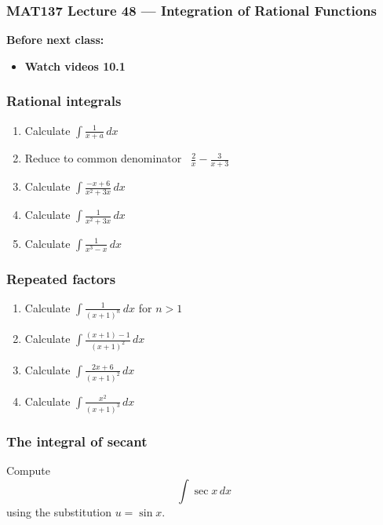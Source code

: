\documentclass[14pt]{beamer}
\newcommand{\setsize}[1]{\fontsize{#1}{#1}\selectfont} %
\newcommand{\smallerfont}{\setsize{13}} %
\newcommand{\vv}{\vspace{.2cm}}
\begin{document}
\begin{frame}
	\frametitle{MAT137 Lecture 48 --- Integration of Rational Functions}

	\vfill
	{\bf Before next class:}
		\begin{itemize} \normalsize
			\item {\bf Watch videos 10.1}
		\end{itemize}
\end{frame}
	\begin{frame}[t]
		\smallerfont
		\frametitle{Rational integrals}

		\begin{enumerate}
			\item Calculate ${\displaystyle \int \frac{1}{x+a} \, dx}$ \vv

			\item Reduce to common denominator \, ${\displaystyle \frac{2}{x} - \frac{3}{x+3}}$
				\vv

			\item Calculate ${\displaystyle \int \frac{-x + 6}{x^{2} + 3x} \, dx }$ \vv

			\item Calculate ${\displaystyle  \int \frac{1}{x^{2} + 3x} \, dx }$ \vv

			\item Calculate ${\displaystyle  \int \frac{1}{x^{3}-x} \, dx }$
		\end{enumerate}
	\end{frame}
	\begin{frame}[t]
		\smallerfont
		\frametitle{Repeated factors}

		\begin{enumerate}
			\item Calculate ${\displaystyle \int \frac{1}{(x+1)^{n}} \, dx}$ \quad for
				$n >1$ \vv

			\item Calculate ${\displaystyle \int \frac{(x+1) - 1}{(x+1)^{2}} \, dx }$ \vv

			\item Calculate ${\displaystyle \int \frac{2x + 6}{(x+1)^{2}} \, dx }$ \vv

			\item Calculate ${\displaystyle \int \frac{x^{2}}{(x+1)^{3}} \, dx }$
		\end{enumerate}
	\end{frame}
	\begin{frame}[t]
		\frametitle{The integral of secant}

		Compute
		\[
			\int \sec x \, dx
		\]
		using the substitution ${\displaystyle u = \sin x}$.
	\end{frame}
\end{document}
